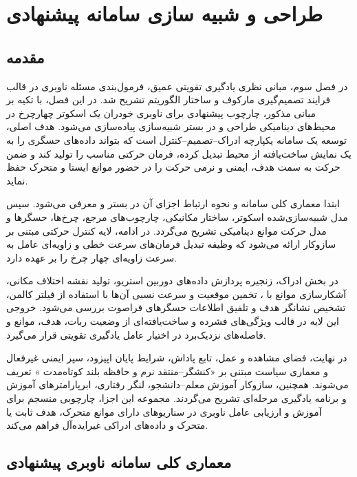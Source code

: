 \chapter{طراحی و  شبیه سازی سامانه پیشنهادی}
\section{مقدمه}
\label{sec:chapter4_intro}

در فصل سوم، مبانی نظری یادگیری تقویتی عمیق، فرمول‌بندی مسئله ناوبری در قالب فرایند تصمیم‌گیری مارکوف و ساختار الگوریتم  تشریح شد. در این فصل، با تکیه بر مبانی مذکور، چارچوب پیشنهادی برای ناوبری خودران یک اسکوتر چهارچرخ در محیط‌های دینامیکی طراحی و در بستر شبیه‌سازی پیاده‌سازی می‌شود. هدف اصلی، توسعه یک سامانه یکپارچه ادراک--تصمیم--کنترل است که بتواند داده‌های حسگری را به یک نمایش ساخت‌یافته از محیط تبدیل کرده، فرمان حرکتی مناسب را تولید کند و ضمن حرکت به سمت هدف، ایمنی و نرمی حرکت را در حضور موانع ایستا و متحرک حفظ نماید.

ابتدا معماری کلی سامانه و نحوه ارتباط اجزای آن در بستر  و  معرفی می‌شود. سپس مدل شبیه‌سازی‌شده اسکوتر، ساختار مکانیکی، چارچوب‌های مرجع، چرخ‌ها، حسگرها و مدل حرکت موانع دینامیکی تشریح می‌گردد. در ادامه، لایه کنترل حرکتی مبتنی بر سازوکار  ارائه می‌شود که وظیفه تبدیل فرمان‌های سرعت خطی و زاویه‌ای عامل به سرعت زاویه‌ای چهار چرخ را بر عهده دارد.

در بخش ادراک، زنجیره پردازش داده‌های دوربین استریو، تولید نقشه اختلاف مکانی، آشکارسازی موانع با ، تخمین موقعیت و سرعت نسبی آن‌ها با استفاده از فیلتر کالمن، تشخیص نشانگر هدف و تلفیق اطلاعات حسگرهای فراصوت بررسی می‌شود. خروجی این لایه در قالب ویژگی‌های فشرده و ساخت‌یافته‌ای از وضعیت ربات، هدف، موانع و فاصله‌های نزدیک‌برد در اختیار عامل یادگیری تقویتی قرار می‌گیرد.

در نهایت، فضای مشاهده و عمل، تابع پاداش، شرایط پایان اپیزود، سپر ایمنی غیرفعال و معماری سیاست مبتنی بر «کنشگر--منتقد نرم و حافظه بلند کوتاه‌مدت%
» %
تعریف می‌شوند. همچنین، سازوکار آموزش معلم--دانشجو، لنگر رفتاری، ابرپارامترهای آموزش و برنامه یادگیری مرحله‌ای تشریح می‌گردند. مجموعه این اجزا، چارچوبی منسجم برای آموزش و ارزیابی عامل ناوبری در سناریوهای دارای موانع متحرک، هدف ثابت یا متحرک و داده‌های ادراکی غیرایده‌آل فراهم می‌کند.


\section{معماری کلی سامانه ناوبری پیشنهادی}
\label{sec:proposed_navigation_architecture}

